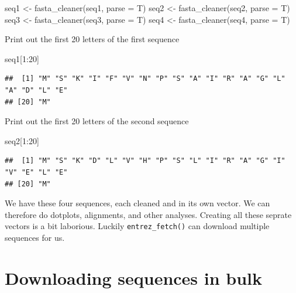\documentclass[
]{book}
\newenvironment{Shaded}{\begin{snugshade}}{\end{snugshade}}
\newcommand{\AttributeTok}[1]{\textcolor[rgb]{0.77,0.63,0.00}{#1}}
\newcommand{\DecValTok}[1]{\textcolor[rgb]{0.00,0.00,0.81}{#1}}
\newcommand{\FunctionTok}[1]{\textcolor[rgb]{0.00,0.00,0.00}{#1}}
\newcommand{\NormalTok}[1]{#1}
\newcommand{\OtherTok}[1]{\textcolor[rgb]{0.56,0.35,0.01}{#1}}
\newcommand{\SpecialCharTok}[1]{\textcolor[rgb]{0.00,0.00,0.00}{#1}}
\begin{document}
\begin{Shaded}
\begin{Highlighting}[]
\NormalTok{seq1 }\OtherTok{\textless{}{-}} \FunctionTok{fasta\_cleaner}\NormalTok{(seq1, }\AttributeTok{parse =}\NormalTok{ T)  }
\NormalTok{seq2 }\OtherTok{\textless{}{-}} \FunctionTok{fasta\_cleaner}\NormalTok{(seq2, }\AttributeTok{parse =}\NormalTok{ T)  }
\NormalTok{seq3 }\OtherTok{\textless{}{-}} \FunctionTok{fasta\_cleaner}\NormalTok{(seq3, }\AttributeTok{parse =}\NormalTok{ T)  }
\NormalTok{seq4 }\OtherTok{\textless{}{-}} \FunctionTok{fasta\_cleaner}\NormalTok{(seq4, }\AttributeTok{parse =}\NormalTok{ T)  }
\end{Highlighting}
\end{Shaded}

Print out the first 20 letters of the first sequence

\begin{Shaded}
\begin{Highlighting}[]
\NormalTok{seq1[}\DecValTok{1}\SpecialCharTok{:}\DecValTok{20}\NormalTok{]                                   }
\end{Highlighting}
\end{Shaded}

\begin{verbatim}
##  [1] "M" "S" "K" "I" "F" "V" "N" "P" "S" "A" "I" "R" "A" "G" "L" "A" "D" "L" "E"
## [20] "M"
\end{verbatim}

Print out the first 20 letters of the second sequence

\begin{Shaded}
\begin{Highlighting}[]
\NormalTok{seq2[}\DecValTok{1}\SpecialCharTok{:}\DecValTok{20}\NormalTok{]                                   }
\end{Highlighting}
\end{Shaded}

\begin{verbatim}
##  [1] "M" "S" "K" "D" "L" "V" "H" "P" "S" "L" "I" "R" "A" "G" "I" "V" "E" "L" "E"
## [20] "M"
\end{verbatim}

We have these four sequences, each cleaned and in its own vector. We can therefore do dotplots, alignments, and other analyses. Creating all these seprate vectors is a bit laborious. Luckily \texttt{entrez\_fetch()} can download multiple sequences for us.

\hypertarget{downloading-sequences-in-bulk}{%
\section{Downloading sequences in bulk}\label{downloading-sequences-in-bulk}}
\end{document}
